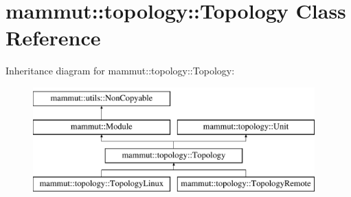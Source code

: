 \hypertarget{classmammut_1_1topology_1_1Topology}{\section{mammut\-:\-:topology\-:\-:Topology Class Reference}
\label{classmammut_1_1topology_1_1Topology}
}
Inheritance diagram for mammut\-:\-:topology\-:\-:Topology\-:\begin{figure}[H]
\begin{center}
\leavevmode
\includegraphics[height=4.000000cm]{classmammut_1_1topology_1_1Topology}
\end{center}
\end{figure}
